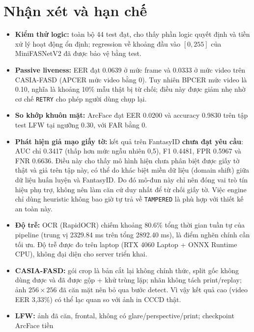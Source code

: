 \documentclass[12pt,a4paper]{article}
\begin{document}
\section{Nhận xét và hạn chế}
\begin{itemize}
  \item \textbf{Kiểm thử logic:} toàn bộ 44 test đạt, cho thấy phần logic quyết định và tiền xử lý hoạt động
        ổn định; regression về khoảng đầu vào $[0,255]$ của MiniFASNetV2 đã được bảo vệ bằng test.
  \item \textbf{Passive liveness:} EER đạt \num{0.0639} ở mức frame và \num{0.0333} ở mức video trên CASIA-FASD
        (APCER mức video bằng 0). Tuy nhiên BPCER mức video là \num{0.10}, nghĩa là khoảng 10\% mẫu thật bị
        từ chối; điều này được giảm nhẹ nhờ cơ chế \texttt{RETRY} cho phép người dùng chụp lại.
  \item \textbf{So khớp khuôn mặt:} ArcFace đạt EER \num{0.0200} và accuracy \num{0.9830} trên tập test LFW
        tại ngưỡng \num{0.30}, với FAR bằng 0.
  \item \textbf{Phát hiện giả mạo giấy tờ:} kết quả trên FantasyID \textbf{chưa đạt yêu cầu}: AUC chỉ
        \num{0.3417} (thấp hơn mức ngẫu nhiên 0,5), F1 \num{0.4481}, FPR \num{0.5967} và FNR \num{0.6636}.
        Điều này cho thấy mô hình hiện chưa phân biệt được giấy tờ thật và giả trên tập này, có thể do khác biệt
        miền dữ liệu (domain shift) giữa dữ liệu huấn luyện và FantasyID. Do đó mô-đun này chỉ nên đóng vai trò
        tín hiệu phụ trợ, không nên làm căn cứ duy nhất để từ chối giấy tờ. Việc engine chỉ dùng heuristic không
        bao giờ tự trả về \texttt{TAMPERED} là phù hợp với thiết kế an toàn này.
  \item \textbf{Độ trễ:} OCR (RapidOCR) chiếm khoảng \num{80.6}\% tổng thời gian tuần tự của pipeline
        (trung vị \num{2329.84} ms trên tổng \num{2892.40} ms), là điểm nghẽn chính cần tối ưu. Độ trễ
        được đo trên laptop (RTX 4060 Laptop + ONNX Runtime CPU), không đại diện cho server triển khai.
  \item \textbf{CASIA-FASD:} gói crop là bản cắt lại không chính thức, split gốc không dùng được và đã
        được gộp + khử trùng lặp; nhãn không tách print/replay; ảnh $256\times256$ đã căn mặt nên bỏ qua
        bước detect. Vì vậy kết quả cao (video EER 3,33\%) có thể lạc quan so với ảnh in CCCD thật.
  \item \textbf{LFW:} ảnh đã căn, frontal, không có glare/perspective/print; checkpoint ArcFace tiền

\end{itemize}
\end{document}
